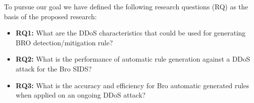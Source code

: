 


To pursue our goal we have defined the following research questions (RQ) as the basis of the proposed research:





\begin{itemize}	
	\item \textbf{RQ1:} What are the DDoS characteristics that could be used for generating BRO detection/mitigation rule?
	\item \textbf{RQ2:} What is the performance of automatic rule generation against a DDoS attack for the Bro SIDS?
	 \item \textbf{RQ3:} What is the accuracy and efficiency for Bro automatic generated rules when applied on an ongoing DDoS attack?
\end{itemize}

